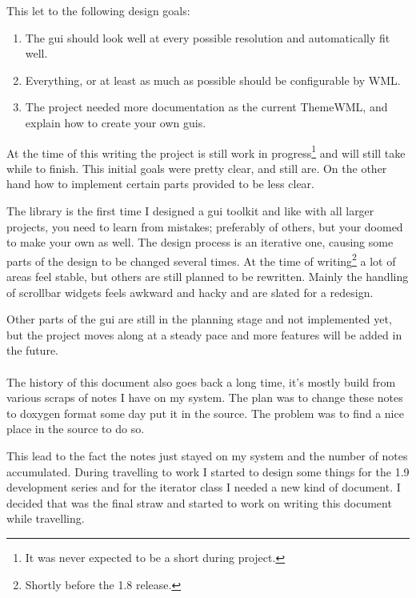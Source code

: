 \documentclass[a4paper,notitlepage,twocolumn,draft]{report}
\begin{document}
This let to the following design goals:

\begin{enumerate}
\item The gui should look well at every possible resolution and automatically
	fit well.
\item Everything, or at least as much as possible should be configurable by WML.
\item The project needed more documentation as the current ThemeWML, and explain
	how to create your own guis.
\end{enumerate}

At the time of this writing the project is still work in progress\footnote{It
was never expected to be a short during project.} and will still take while to
finish. This initial goals were pretty clear, and still are. On the other hand
how to implement certain parts provided to be less clear.

The library is the first time I designed a gui toolkit and like with all larger
projects, you need to learn from mistakes; preferably of others, but your doomed
to make your own as well. The design process is an iterative one, causing some
parts of the design to be changed several times. At the time of
writing\footnote{Shortly before the 1.8 release.} a lot of areas feel stable,
but others are still planned to be rewritten. Mainly the handling of scrollbar
widgets feels awkward and hacky and are slated for a redesign.

Other parts of the gui are still in the planning stage and not implemented yet,
but the project moves along at a steady pace and more features will be added in
the future.

\paragraph{}

The history of this document also goes back a long time, it's mostly build from
various scraps of notes I have on my system. The plan was to change these notes
to doxygen format some day put it in the source. The problem was to find a nice
place in the source to do so.

This lead to the fact the notes just stayed on my system and the number of
notes accumulated. During travelling to work I started to design some things for
the 1.9 development series and for the iterator class I needed a new kind of
document. I decided that was the final straw and started to work on writing this
document while travelling.
\end{document}
